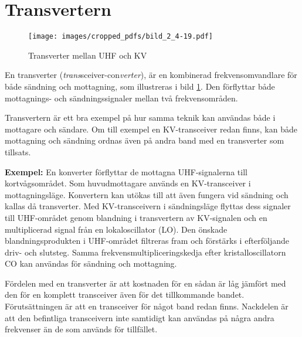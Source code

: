 \section{Transvertern}

\begin{figure}
  \texttt{[image: images/cropped\_pdfs/bild\_2\_4-19.pdf]}
  \caption{Transverter mellan UHF och KV}
  \label{fig:bildII4-19}
\end{figure}

En transverter (\emph{trans}sceiver-con\emph{verter}), är en kombinerad
frekvensomvandlare för både sändning och mottagning, som illustreras i
bild \ref{fig:bildII4-19}.
Den förflyttar både mottagnings- och sändningssignaler mellan två
frekvensområden.

Transvertern är ett bra exempel på hur samma teknik kan användas både
i mottagare och sändare.
Om till exempel en KV-transceiver redan finns, kan både mottagning och sändning
ordnas även på andra band med en transverter som tillsats.

\textbf{Exempel:}
En konverter förflyttar de mottagna UHF-signalerna till kortvågsområdet.
Som huvudmottagare används en KV-transceiver i mottagningsläge.
Konvertern kan utökas till att även fungera vid sändning och kallas då
transverter.
Med KV-transceivern i sändningsläge flyttas dess signaler till UHF-området
genom blandning i transvertern av KV-signalen och en multiplicerad signal
från en lokaloscillator (LO).
Den önskade blandningsprodukten i UHF-området filtreras fram och förstärks i
efterföljande driv- och slutsteg.
Samma frekvensmultipliceringskedja efter kristalloscillatorn CO kan användas
för sändning och mottagning.

Fördelen med en transverter är att kostnaden för en sådan är låg jämfört med
den för en komplett transceiver även för det tillkommande bandet.
Förutsättningen är att en transceiver för något band redan finns.
Nackdelen är att den befintliga transceivern inte samtidigt kan användas på
några andra frekvenser än de som används för tillfället.
